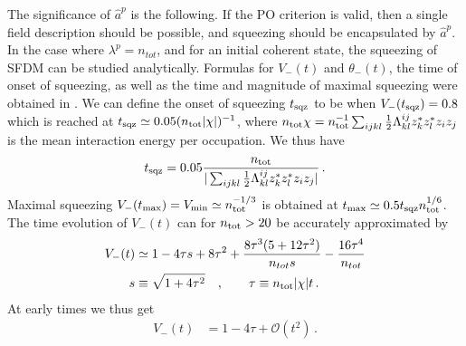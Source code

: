 \documentclass[aps,prd,twocolumn,superscriptaddress]{revtex4-1}
\begin{document}
The significance of $\hat a^{p}$ is the following. 
If the PO criterion is valid, then a single field description should be possible, and squeezing should be encapsulated by $\hat a^{p}$.
In the case where $\lambda^p=n_{tot}$, and for an initial coherent state, the squeezing of SFDM can be studied analytically. Formulas for $V_-(t)$ and $\theta_-(t)$, the time of onset of squeezing, as well as the time and magnitude of maximal squeezing were obtained in \cite{KoppFragkosPikovski2021}.
We can define the onset of squeezing $t_{\rm sqz}$ to be when $V_-(t_{\rm sqz}) = 0.8$ which is reached at $t_{\rm sqz} \simeq 0.05 (n_{\rm tot} |\chi|)^{-1}$, where $n_{\rm tot} \chi =  n^{-1}_{\rm tot}\sum_{ijkl} \tfrac{1}{2}\Lambda^{ij}_{kl} z^*_k z^*_l z_i z_j$  is the mean interaction energy per occupation. We thus have
\begin{equation}
    t_{\rm sqz} = 0.05 \frac{ n_{\rm tot}}{|\sum_{ijkl} \tfrac{1}{2}\Lambda^{ij}_{kl} z^*_k z^*_l z_i z_j|} \,.
\end{equation}
Maximal squeezing $V_-(t_{\rm max}) = V_{\rm min} \simeq n_{\rm tot}^{-1/3}$ is obtained at $t_{\rm max} \simeq 0.5 t_{\rm sqz} n^{1/6}_{\rm tot}$.
The time evolution of $V_{-}(t)$ can for $n_{\rm tot} >20$ be accurately approximated by 
\begin{align} 
    V_-(t) &\simeq 1 - 4 \tau s + 8 \tau^2  + \frac{8 \tau^3(5+12 \tau^2)}{n_{tot} s}  - \frac{16 \tau^4}{n_{tot}}\nonumber\\
    s & \equiv \sqrt{1+ 4 \tau ^2} \quad, \qquad\tau \equiv   n_{\rm tot}  | \chi | t  \,. \label{VminusBajer}
\end{align}
At early times we thus get
\begin{align} 
    V_-(t) &= 1 - 4 \tau + \mathcal{O}(t^2) \,.
\end{align}
\end{document}
